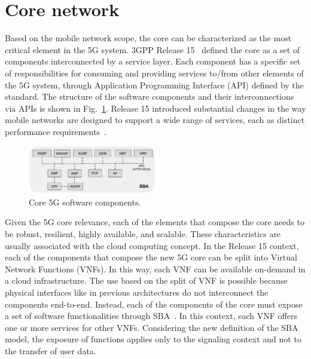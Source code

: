 \section{Core network}
\label{sec:core}

Based on the mobile network scope, the core can be characterized as the most critical element in the 5G system. 3GPP Release 15~\cite{3gpp:rel15nr21.915} defined the core as a set of components interconnected by a service layer. Each component has a specific set of responsibilities for consuming and providing services to/from other elements of the 5G system, through Application Programming Interface (API) defined by the standard. The structure of the software components and their interconnections via APIs is shown in Fig.~\ref{5GCore}. Release 15 introduced substantial changes in the way mobile networks are designed to support a wide range of services, each as distinct performance requirements~\cite{foukas2017network}.

\begin{figure}[hbt]  
 \begin{center}
\includegraphics[width=0.5\textwidth]{figs/5G-Core.pdf}
  \end{center}
\caption{Core 5G software components.}
\label{5GCore}
\end{figure}

Given the 5G core relevance, each of the elements that compose the core needs to be robust, resilient, highly available, and scalable. These characteristics are usually associated with the cloud computing concept. In the Release 15 context, each of the components that compose the new 5G core can be split into Virtual Network Functions (VNFs). In this way, each VNF can be available on-demand in a cloud infrastructure. The use based on the split of VNF is possible because physical interfaces like in previous architectures do not interconnect the components end-to-end. Instead, each of the components of the core must expose a set of software functionalities through SBA~\cite{karnouskos2012SOA}. In this context, each VNF offers one or more services for other VNFs. Considering the new definition of the SBA model, the exposure of functions applies only to the signaling context and not to the transfer of user data.

